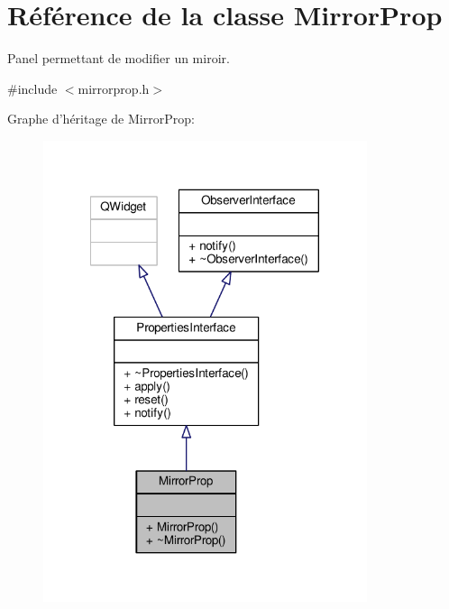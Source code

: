 \hypertarget{classMirrorProp}{\section{Référence de la classe Mirror\+Prop}
\label{classMirrorProp}
}


Panel permettant de modifier un miroir.  




{\ttfamily \#include $<$mirrorprop.\+h$>$}



Graphe d'héritage de Mirror\+Prop\+:\nopagebreak
\begin{figure}[H]
\begin{center}
\leavevmode
\includegraphics[width=269pt]{dc/d36/classMirrorProp__inherit__graph}
\end{center}
\end{figure}


